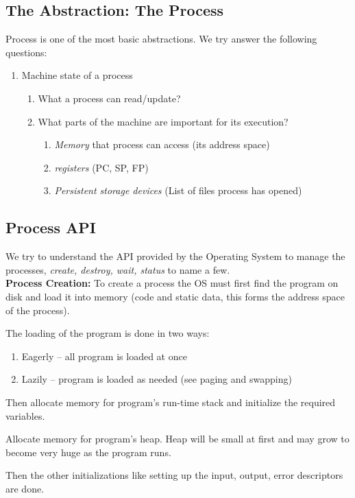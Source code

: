 \documentclass[11pt]{article}
\begin{document}
\subsection*{The Abstraction: The Process}
Process is one of the most basic abstractions. We try answer the following
questions:
\begin{enumerate}
\item Machine state of a process
  \begin{enumerate}
  \item What a process can read/update?
  \item What parts of the machine are important for its execution?
    \begin{enumerate}
    \item \emph{Memory} that process can access (its address space)
    \item \emph{registers} (PC, SP, FP)
    \item \emph{Persistent storage devices} (List of files process has opened)
    \end{enumerate}
  \end{enumerate}
\end{enumerate}

\subsection*{Process API}
We try to understand the API provided by the Operating System to manage the
processes, \emph{create, destroy, wait, status} to name a few.\\

\textbf{Process Creation:} To create a process the OS must first find the
program on disk and load it into memory (code and static data, this forms the
address space of the process).

The loading of the program is done in two ways:
\begin{enumerate}
\item Eagerly -- all program is loaded at once
\item Lazily -- program is loaded as needed (see paging and swapping)
\end{enumerate}

Then allocate memory for program's run-time stack and initialize the required
variables.

Allocate memory for program's heap. Heap will be small at first and may grow to
become very huge as the program runs.

Then the other initializations like setting up the input, output, error
descriptors are done.
\end{document}
